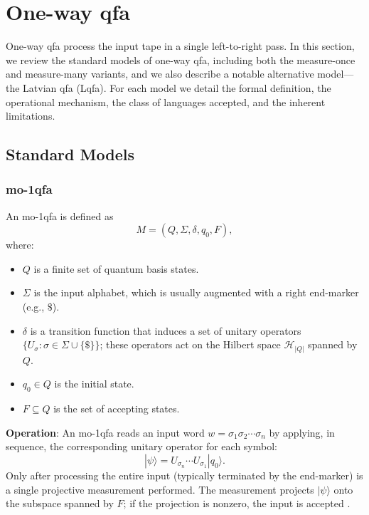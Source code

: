 
\section{One-way \gls{qfa}}
\label{sec:one-way-qfas}

One-way \gls{qfa} process the input tape in a single left-to-right pass. In this section, we review the standard models of one-way \gls{qfa}, including both the measure-once and measure-many variants, and we also describe a notable alternative model—the Latvian \gls{qfa} (Lqfa). For each model we detail the formal definition, the operational mechanism, the class of languages accepted, and the inherent limitations.

\subsection{Standard Models}
\label{subsec:standard-models}

\subsubsection{\acrfull{mo-1qfa}}
\label{sssec:mo-1qfa}
\begin{definition}[mo-1qfa]
An \gls{mo-1qfa} is defined as 
\[
M = (Q, \Sigma, \delta, q_0, F),
\]
where:
\begin{itemize}
    \item \( Q \) is a finite set of quantum basis states.
    \item \( \Sigma \) is the input alphabet, which is usually augmented with a right end-marker (e.g., \( \$ \)).
    \item \( \delta \) is a transition function that induces a set of unitary operators \( \{ U_\sigma : \sigma \in \Sigma \cup \{\$\} \} \); these operators act on the Hilbert space \( \mathcal{H}_{|Q|} \) spanned by \( Q \).
    \item \( q_0 \in Q \) is the initial state.
    \item \( F \subseteq Q \) is the set of accepting states.
\end{itemize}
\end{definition}

\textbf{Operation}:  
An \gls{mo-1qfa} reads an input word \( w = \sigma_1\sigma_2\cdots\sigma_n \) by applying, in sequence, the corresponding unitary operator for each symbol:
\[
|\psi\rangle = U_{\sigma_n} \cdots U_{\sigma_1} |q_0\rangle.
\]
Only after processing the entire input (typically terminated by the end-marker) is a single projective measurement performed. The measurement projects \( |\psi\rangle \) onto the subspace spanned by \( F \); if the projection is nonzero, the input is accepted \cite{moore2000quantum,bertoni2001regular}.

